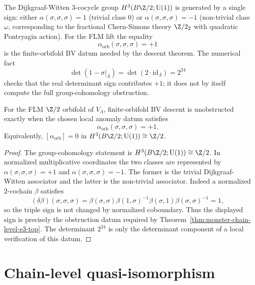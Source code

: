 The Dijkgraaf-Witten 3-cocycle group $H^3(B\Z/2;\mathrm{U}(1))$ is
generated by a single sign: either $\alpha(\sigma,\sigma,\sigma) = 1$
(trivial class $0$) or $\alpha(\sigma,\sigma,\sigma) = -1$
(non-trivial class $\omega$, corresponding to the fractional
Chern-Simons theory $\Z/2_2$ with quadratic Pontryagin action).
For the FLM lift the equality
\[
 \alpha_{\mathrm{orb}}(\sigma,\sigma,\sigma)=+1
\]
is the finite-orbifold BV datum needed by the descent theorem. The
numerical fact
\[
 \det(1-\sigma|_\Lambda)=\det(2\cdot\mathrm{id}_\Lambda)=2^{24}
\]
checks that the real determinant sign contributes $+1$; it does not
by itself compute the full group-cohomology obstruction.

\begin{proposition}
\label{prop:monster-alpha-explicit-zero}
For the FLM $\Z/2$ orbifold of $V_\Lambda$, finite-orbifold BV
descent is unobstructed exactly when the chosen local anomaly datum
satisfies
\[
 \alpha_{\mathrm{orb}}(\sigma,\sigma,\sigma)=+1.
\]
Equivalently, $[\alpha_{\mathrm{orb}}]=0$ in
$H^3(B\Z/2;\mathrm{U}(1))\cong\Z/2$.
\end{proposition}

\begin{proof}
The group-cohomology statement is
$H^3(B\Z/2;\mathrm{U}(1))\cong\Z/2$. In normalized multiplicative
coordinates the two classes are represented by
$\alpha(\sigma,\sigma,\sigma)=+1$ and
$\alpha(\sigma,\sigma,\sigma)=-1$. The former is the trivial
Dijkgraaf-Witten associator and the latter is the non-trivial
associator. Indeed a normalized $2$-cochain $\beta$ satisfies
\[
 (\delta\beta)(\sigma,\sigma,\sigma)
 =
 \beta(\sigma,\sigma)\beta(1,\sigma)^{-1}
 \beta(\sigma,1)\beta(\sigma,\sigma)^{-1}
 =1,
\]
so the triple sign is not changed by normalized coboundary. Thus the
displayed sign is precisely the obstruction datum required by
Theorem~\ref{thm:monster-chain-level-e3-top}. The determinant
$2^{24}$ is only the determinant component of a local verification of
this datum.
\end{proof}

\section{Chain-level quasi-isomorphism}
\label{sec:monster-chain-qi}

